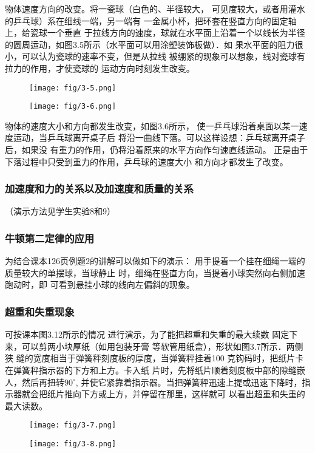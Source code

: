 物体速度方向的改变。将一瓷球（白色的、半径较大，
可见度较大，或者用灌水的乒乓球）系在细线一端，另一端有
一金属小杯，把环套在竖直方向的固定轴上，给瓷球一个垂直
于拉线方向的速度，球就在水平面上沿着一个以线长为半径
的圆周运动，如图3.5所示（水平面可以用涂塑装饰板做）．如
果水平面的阻力很小，可以认为瓷球的速率不变，但是从拉线
被绷紧的现象可以想象，线对瓷球有拉力的作用，才使瓷球的
运动方向时刻发生改变。
\begin{figure}[htp]\centering
    \begin{minipage}[t]{0.48\textwidth}
    \centering
    \texttt{[image: fig/3-5.png]}
    \caption{}
    \end{minipage}
    \begin{minipage}[t]{0.48\textwidth}
    \centering
    \texttt{[image: fig/3-6.png]}
    \caption{}
    \end{minipage}
    \end{figure}

物体的速度大小和方向都发生改变，如图3.6所示，
使一乒乓球沿着桌面以某一速度运动，当乒乓球离开桌子后
将沿一曲线下落。可以这样设想：乒乓球离开桌子后，如果没
有重力的作用，仍将沿着原来的水平方向作匀速直线运动。
正是由于下落过程中只受到重力的作用，乒乓球的速度大小
和方向才都发生了改变。

\subsubsection{加速度和力的关系以及加速度和质量的关系}
（演示方法见学生实验8和9）

\subsubsection{牛顿第二定律的应用}
为结合课本126页例题2的讲解可以做如下的演示：
用手提着一个挂在细绳一端的质量较大的单摆球，当球静止
时，细绳在竖直方向，当提着小球突然向右侧加速跑动时，即
可看到悬挂小球的线向左偏斜的现象。

\subsubsection{超重和失重现象}

可按课本图3.12所示的情况
进行演示，为了能把超重和失重的最大续数
固定下来，可以剪两小块厚纸（如用包装牙膏
等软管用纸盒），形状如图3.7所示．两侧狭
缝的宽度相当于弹簧秤刻度板的厚度，当弹簧秤挂着100
克钩码时，把纸片卡在弹簧秤指示器的下方和上方。卡入纸
片时，先将纸片顺着刻度板中部的隙缝嵌人，然后再扭转$90^{\circ}$,
并使它紧靠着指示器。当把弹簧秤迅速上提或迅速下降时，指
示器就会把纸片推向下方或上方，并停留在那里，这样就可
以看出超重和失重的最大读数。
\begin{figure}[htp]\centering
    \begin{minipage}[t]{0.48\textwidth}
    \centering
    \texttt{[image: fig/3-7.png]}
    \caption{}
    \end{minipage}
    \begin{minipage}[t]{0.48\textwidth}
    \centering
    \texttt{[image: fig/3-8.png]}
    \caption{}
    \end{minipage}
    \end{figure}

